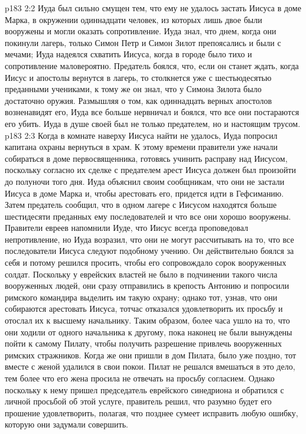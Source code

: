 \vs p183 2:2 Иуда был сильно смущен тем, что ему не удалось застать Иисуса в доме Марка, в окружении одиннадцати человек, из которых лишь двое были вооружены и могли оказать сопротивление. Иуда знал, что днем, когда они покинули лагерь, только Симон Петр и Симон Зилот препоясались и были с мечами; Иуда надеялся схватить Иисуса, когда в городе было тихо и сопротивление маловероятно. Предатель боялся, что, если он станет ждать, когда Иисус и апостолы вернутся в лагерь, то столкнется уже с шестьюдесятью преданными учениками, к тому же он знал, что у Симона Зилота было достаточно оружия. Размышляя о том, как одиннадцать верных апостолов возненавидят его, Иуда все больше нервничал и боялся, что все они постараются его убить. Иуда в душе своей был не только предателем, но и настоящим трусом.
\vs p183 2:3 Когда в комнате наверху Иисуса найти не удалось, Иуда попросил капитана охраны вернуться в храм. К этому времени правители уже начали собираться в доме первосвященника, готовясь учинить расправу над Иисусом, поскольку согласно их сделке с предателем арест Иисуса должен был произойти до полуночи того дня. Иуда объяснил своим сообщникам, что они не застали Иисуса в доме Марка и, чтобы арестовать его, придется идти в Гефсиманию. Затем предатель сообщил, что в одном лагере с Иисусом находятся больше шестидесяти преданных ему последователей и что все они хорошо вооружены. Правители евреев напомнили Иуде, что Иисус всегда проповедовал непротивление, но Иуда возразил, что они не могут рассчитывать на то, что все последователи Иисуса следуют подобному учению. Он действительно боялся за себя и потому решился просить, чтобы его сопровождало сорок вооруженных солдат. Поскольку у еврейских властей не было в подчинении такого числа вооруженных людей, они сразу отправились в крепость Антонию и попросили римского командира выделить им такую охрану; однако тот, узнав, что они собираются арестовать Иисуса, тотчас отказался удовлетворить их просьбу и отослал их к высшему начальнику. Таким образом, более часа ушло на то, что они ходили от одного начальника к другому, пока наконец не были вынуждены пойти к самому Пилату, чтобы получить разрешение привлечь вооруженных римских стражников. Когда же они пришли в дом Пилата, было уже поздно, тот вместе с женой удалился в свои покои. Пилат не решался вмешаться в это дело, тем более что его жена просила не отвечать на просьбу согласием. Однако поскольку к нему пришел председатель еврейского синедриона и обратился с личной просьбой об этой услуге, правитель решил, что разумно будет его прошение удовлетворить, полагая, что позднее сумеет исправить любую ошибку, которую они задумали совершить.
